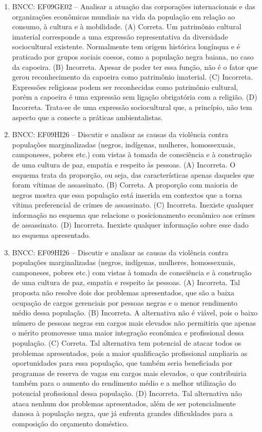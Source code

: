 
\begin{enumerate}
\item
BNCC: EF09GE02 -- Analisar a atuação das corporações internacionais e
das organizações econômicas mundiais na vida da população em relação ao
consumo, à cultura e à mobilidade. (A) Correta. Um patrimônio cultural imaterial corresponde a uma expressão representativa da diversidade sociocultural existente. Normalmente tem origem histórica longínqua e é praticado por grupos sociais coesos, como a população negra baiana, no caso da capoeira. (B) Incorreta. Apesar de poder ter essa função, não é o fator que gerou reconhecimento da capoeira como patrimônio imaterial. (C) Incorreta. Expressões religiosas podem ser reconhecidas como patrimônio cultural, porém a capoeira é uma expressão sem ligação obrigatória com a religião. (D) Incorreta. Trata-se de uma expressão sociocultural que, a princípio, não tem aspecto que a conecte a práticas ambientalistas.

\item
BNCC: EF09HI26 -- Discutir e analisar as causas da violência contra
populações marginalizadas (negros, indígenas, mulheres, homossexuais,
camponeses, pobres etc.) com vistas à tomada de consciência e à
construção de uma cultura de paz, empatia e respeito às pessoas. (A) Incorreta. O esquema trata da proporção, ou seja, das características apenas daqueles que foram vítimas de assassinato. (B) Correta. A proporção com maioria de negros mostra que essa população está inserida em contextos que a torna vítima preferencial de crimes de assassinato. (C) Incorreta. Inexiste qualquer informação no esquema que relacione o posicionamento econômico aos crimes de assassinato. (D) Incorreta. Inexiste qualquer informação sobre esse dado no esquema apresentado.

\item
BNCC: EF09HI26 -- Discutir e analisar as causas da violência contra
populações marginalizadas (negros, indígenas, mulheres, homossexuais,
camponeses, pobres etc.) com vistas à tomada de consciência e à
construção de uma cultura de paz, empatia e respeito às pessoas. (A) Incorreta. Tal proposta não resolve dois dos problemas apresentados, que são a baixa ocupação de cargos gerenciais por pessoas negras e o menor rendimento médio dessa população. (B) Incorreta. A alternativa não é viável, pois o baixo número de pessoas negras em cargos mais elevados não permitiria que apenas o mérito promovesse uma maior integração econômica e profissional dessa população. (C) Correta. Tal alternativa tem potencial de atacar todos os problemas apresentados, pois a maior qualificação profissional ampliaria as oportunidades para essa população, que também seria beneficiada por programas de reserva de vagas em cargos mais elevados, o que contribuiria também para o aumento do rendimento médio e a melhor utilização do potencial profissional dessa população. (D) Incorreta. Tal alternativa não ataca nenhum dos problemas apresentados, além de ser potencialmente danosa à população negra, que já enfrenta grandes dificuldades para a composição do orçamento doméstico.
\end{enumerate}

